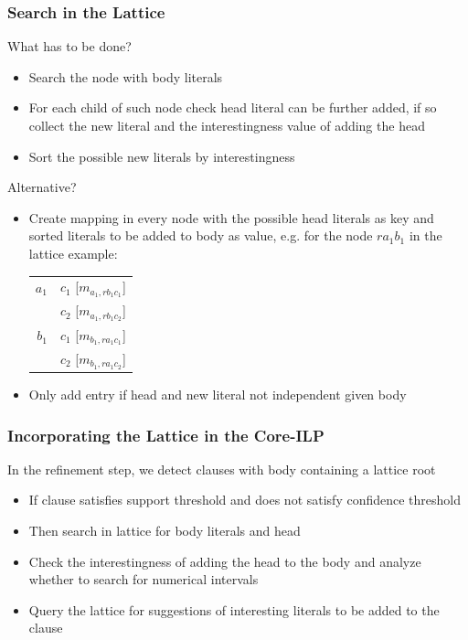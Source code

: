 \documentclass{beamer}
\begin{document}
\begin{frame} 
\frametitle{Search in the Lattice}
   What has to be done?
  \begin{itemize}
   \item Search the node with body literals
   \item For each child of such node check head literal can be further added, if so collect the new literal and the
interestingness value of adding the head
   \item Sort the possible new literals by interestingness
  \end{itemize}
  Alternative?
  \begin{itemize}
   \item Create mapping in every node with the possible head literals as key and sorted literals to be added to body as
value, e.g. for the node $r a_1 b_1$ in the lattice example:
   \begin{center}
    \begin{tabular}{r | l}
      $a_1$ 	& $c_1$ [$m_{a_1 , r b_1 c_1}$] \\
		& $c_2$ [$m_{a_1 , r b_1 c_2}$] \\
      \hline
      $b_1$	& $c_1$ [$m_{b_1 , r a_1 c_1}$] \\
		& $c_2$ [$m_{b_1 , r a_1 c_2}$]
    \end{tabular}
   \end{center}
   \item Only add entry if head and new literal not independent given body
  \end{itemize}
\end{frame}
\begin{frame}
  \frametitle{Incorporating the Lattice in the Core-ILP}
  In the refinement step, we detect clauses with body containing a lattice root
  \begin{itemize}
  \item If clause satisfies support threshold and does not satisfy confidence threshold
  \item Then search in lattice for body literals and head
  \item Check the interestingness of adding the head to the body and analyze whether to search for numerical intervals
  \item Query the lattice for suggestions of interesting literals to be added to the clause
  \end{itemize}
\end{frame}
\end{document}
